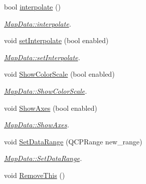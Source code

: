 \begin{DoxyCompactItemize}
\item 
bool \hyperlink{class_map_data_af6a0e12976a942f506035051162e6bac}{interpolate} ()
\begin{DoxyCompactList}\small\item\em \hyperlink{class_map_data_af6a0e12976a942f506035051162e6bac}{Map\+Data\+::interpolate}. \end{DoxyCompactList}\item 
void \hyperlink{class_map_data_a61607dc64ab986d73904ea00a8801284}{set\+Interpolate} (bool enabled)
\begin{DoxyCompactList}\small\item\em \hyperlink{class_map_data_a61607dc64ab986d73904ea00a8801284}{Map\+Data\+::set\+Interpolate}. \end{DoxyCompactList}\item 
void \hyperlink{class_map_data_af6be86434180cebe257194b25eb3b26b}{Show\+Color\+Scale} (bool enabled)
\begin{DoxyCompactList}\small\item\em \hyperlink{class_map_data_af6be86434180cebe257194b25eb3b26b}{Map\+Data\+::\+Show\+Color\+Scale}. \end{DoxyCompactList}\item 
void \hyperlink{class_map_data_a728ba9e61677b4f25c98d2579ec1ac6a}{Show\+Axes} (bool enabled)
\begin{DoxyCompactList}\small\item\em \hyperlink{class_map_data_a728ba9e61677b4f25c98d2579ec1ac6a}{Map\+Data\+::\+Show\+Axes}. \end{DoxyCompactList}\item 
void \hyperlink{class_map_data_a2a31f4dd7ede95fb61852db6cb815ca9}{Set\+Data\+Range} (Q\+C\+P\+Range new\+\_\+range)
\begin{DoxyCompactList}\small\item\em \hyperlink{class_map_data_a2a31f4dd7ede95fb61852db6cb815ca9}{Map\+Data\+::\+Set\+Data\+Range}. \end{DoxyCompactList}\item 
\hypertarget{class_map_data_aa98f0fec1e13eab7858dce7b7fe31561}{void \hyperlink{class_map_data_aa98f0fec1e13eab7858dce7b7fe31561}{Remove\+This} ()}\label{class_map_data_aa98f0fec1e13eab7858dce7b7fe31561}


\end{DoxyCompactItemize}
